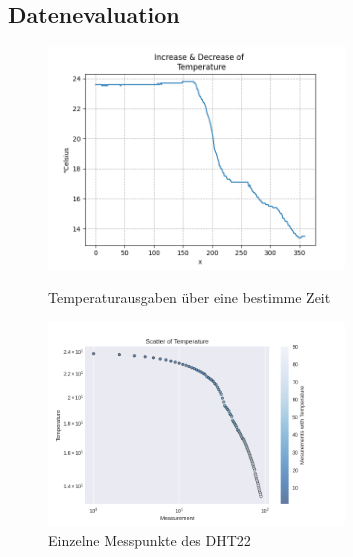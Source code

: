 \documentclass[12pt]{article}
\begin{document}
\subsection{Datenevaluation}
\begin{figure}[H]
\begin{center}
\includegraphics[width=0.7\textwidth]{pics/plot.png}
\caption{Temperaturausgaben über eine bestimme Zeit}
\includegraphics[width=0.7\textwidth]{pics/scatter.png}
\caption{Einzelne Messpunkte des DHT22}
\end{center}
\end{figure}
\newpage
\end{document}
